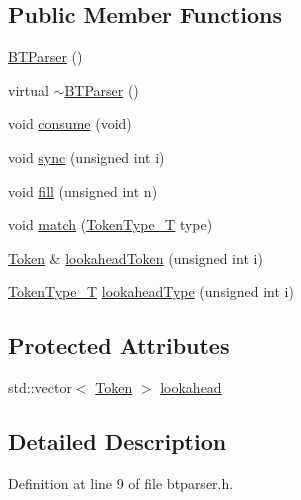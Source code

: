 \subsection*{Public Member Functions}
\begin{DoxyCompactItemize}
\item 
\hyperlink{class_b_t_parser_ad9495eabeaf69d91c5f26131cabd3ec4}{B\-T\-Parser} ()
\item 
virtual \hyperlink{class_b_t_parser_a5965c4cf0baf950be976a0a2932eec2c}{$\sim$\-B\-T\-Parser} ()
\item 
void \hyperlink{class_b_t_parser_a9d72bba86b16427b0b03e91113b0f027}{consume} (void)
\item 
void \hyperlink{class_b_t_parser_a762e16322aec6e50af51c2b6377d86fe}{sync} (unsigned int i)
\item 
void \hyperlink{class_b_t_parser_a366b4477388d2cd7fd655b36342f882c}{fill} (unsigned int n)
\item 
void \hyperlink{class_b_t_parser_ad8fb9348dd9bc2e65a08033dd2539a03}{match} (\hyperlink{token_8h_abf05bcc4c1b09928131e6afd3b768a77}{Token\-Type\-\_\-\-T} type)
\item 
\hyperlink{class_token}{Token} \& \hyperlink{class_b_t_parser_a2674f280bd3000751a100b45ac3899e2}{lookahead\-Token} (unsigned int i)
\item 
\hyperlink{token_8h_abf05bcc4c1b09928131e6afd3b768a77}{Token\-Type\-\_\-\-T} \hyperlink{class_b_t_parser_a01abded048ed1573e03867f7f2316583}{lookahead\-Type} (unsigned int i)
\end{DoxyCompactItemize}
\subsection*{Protected Attributes}
\begin{DoxyCompactItemize}
\item 
std\-::vector$<$ \hyperlink{class_token}{Token} $>$ \hyperlink{class_b_t_parser_a796693745ebe354914eeacddba20f109}{lookahead}
\end{DoxyCompactItemize}


\subsection{Detailed Description}


Definition at line 9 of file btparser.\-h.



